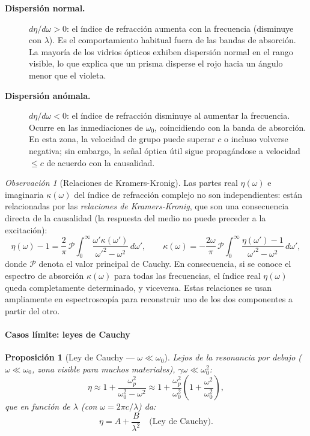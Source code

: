 \documentclass[12pt, a4paper]{article}
\theoremstyle{plain}
\newtheorem{proposicion}[teorema]{Proposición}
\theoremstyle{definition}
\theoremstyle{remark}
\newtheorem*{observacion}{Observación}
\begin{document}
\begin{description}
  \item[\textbf{Dispersión normal.}] $d\eta/d\omega > 0$: el índice de
        refracción aumenta con la frecuencia (disminuye con $\lambda$). Es el
        comportamiento habitual fuera de las bandas de absorción. La mayoría de
        los vidrios ópticos exhiben dispersión normal en el rango visible,
        lo que explica que un prisma disperse el rojo hacia un ángulo menor
        que el violeta.

  \item[\textbf{Dispersión anómala.}] $d\eta/d\omega < 0$: el índice de
        refracción disminuye al aumentar la frecuencia. Ocurre en las
        inmediaciones de $\omega_0$, coincidiendo con la banda de absorción.
        En esta zona, la velocidad de grupo puede superar $c$ o incluso
        volverse negativa; sin embargo, la señal óptica útil sigue
        propagándose a velocidad $\leq c$ de acuerdo con la causalidad.
\end{description}

\begin{observacion}[Relaciones de Kramers-Kronig]
Las partes real $\eta(\omega)$ e imaginaria $\kappa(\omega)$ del índice de
refracción complejo no son independientes: están relacionadas por las
\emph{relaciones de Kramers-Kronig}, que son una consecuencia directa de la
causalidad (la respuesta del medio no puede preceder a la excitación):
\[
  \eta(\omega) - 1 = \frac{2}{\pi}\,\mathcal{P}\!\!\int_0^\infty
  \frac{\omega'\kappa(\omega')}{\omega'^2-\omega^2}\,d\omega',
  \qquad
  \kappa(\omega) = -\frac{2\omega}{\pi}\,\mathcal{P}\!\!\int_0^\infty
  \frac{\eta(\omega')-1}{\omega'^2-\omega^2}\,d\omega',
\]
donde $\mathcal{P}$ denota el valor principal de Cauchy. En consecuencia,
si se conoce el espectro de absorción $\kappa(\omega)$ para todas las
frecuencias, el índice real $\eta(\omega)$ queda completamente determinado,
y viceversa. Estas relaciones se usan ampliamente en espectroscopía para
reconstruir uno de los dos componentes a partir del otro.
\end{observacion}

\paragraph{Casos límite: leyes de Cauchy}

\begin{proposicion}[Ley de Cauchy — $\omega\ll\omega_0$]
Lejos de la resonancia por debajo ($\omega\ll\omega_0$, zona visible para
muchos materiales), $\gamma\omega\ll\omega_0^2$:
\[
  \eta \approx 1 + \frac{\omega_p^2}{\omega_0^2-\omega^2}
     \approx 1 + \frac{\omega_p^2}{\omega_0^2}\!\left(1+\frac{\omega^2}{\omega_0^2}\right),
\]
que en función de $\lambda$ (con $\omega=2\pi c/\lambda$) da:
\begin{equation}
  \eta = A + \frac{B}{\lambda^2} \quad\text{(Ley de Cauchy).}
  \label{eq:cauchy}
\end{equation}
\end{proposicion}
\end{document}
